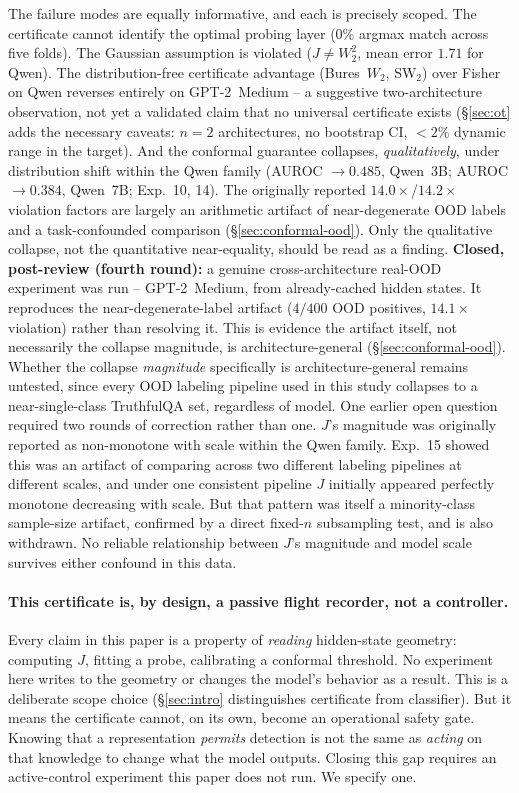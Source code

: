\documentclass[onecolumn]{jmlr}
\begin{document}
The failure modes are equally informative, and each is precisely
scoped. The certificate cannot identify the optimal probing layer (0\%
argmax match across five folds). The Gaussian assumption is violated
($J \neq W_2^2$, mean error $1.71$ for Qwen). The distribution-free
certificate advantage (Bures~$W_2$, SW$_2$) over Fisher on Qwen
reverses entirely on GPT-2~Medium -- a suggestive two-architecture
observation, not yet a validated claim that no universal certificate
exists (\S\ref{sec:ot} adds the necessary caveats: $n=2$ architectures,
no bootstrap CI, $<2\%$ dynamic range in the target). And the conformal
guarantee collapses, \emph{qualitatively}, under distribution shift
within the Qwen family (AUROC $\to 0.485$, Qwen~3B; AUROC $\to 0.384$,
Qwen~7B; Exp.~10, 14). The originally reported
$14.0\times$/$14.2\times$ violation factors are largely an arithmetic
artifact of near-degenerate OOD labels and a task-confounded comparison
(\S\ref{sec:conformal-ood}). Only the qualitative collapse, not the
quantitative near-equality, should be read as a finding. \textbf{Closed,
post-review (fourth round):} a genuine cross-architecture real-OOD
experiment was run -- GPT-2~Medium, from already-cached hidden states.
It reproduces the near-degenerate-label artifact ($4/400$ OOD
positives, $14.1\times$ violation) rather than resolving it. This is
evidence the artifact itself, not necessarily the collapse magnitude,
is architecture-general (\S\ref{sec:conformal-ood}). Whether the
collapse \emph{magnitude} specifically is architecture-general remains
untested, since every OOD labeling pipeline used in this study
collapses to a near-single-class TruthfulQA set, regardless of model.
One earlier open question required two rounds of correction rather
than one. $J$'s magnitude was originally reported as non-monotone with
scale within the Qwen family. Exp.~15 showed this was an artifact of
comparing across two different labeling pipelines at different scales,
and under one consistent pipeline $J$ initially appeared perfectly
monotone decreasing with scale. But that pattern was itself a
minority-class sample-size artifact, confirmed by a direct fixed-$n$
subsampling test, and is also withdrawn. No reliable relationship
between $J$'s magnitude and model scale survives either confound in
this data.

\paragraph{This certificate is, by design, a passive flight recorder,
not a controller.} Every claim in this paper is a property of
\emph{reading} hidden-state geometry: computing $J$, fitting a probe,
calibrating a conformal threshold. No experiment here writes to the
geometry or changes the model's behavior as a result. This is a
deliberate scope choice (\S\ref{sec:intro} distinguishes certificate
from classifier). But it means the certificate cannot, on its own,
become an operational safety gate. Knowing that a representation
\emph{permits} detection is not the same as \emph{acting} on that
knowledge to change what the model outputs. Closing this gap requires
an active-control experiment this paper does not run. We specify one.
\end{document}
